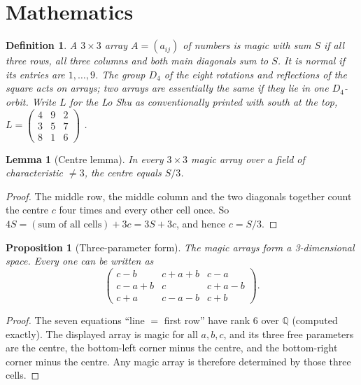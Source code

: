 \documentclass[pdflatex,sn-basic]{sn-jnl}
\theoremstyle{thmstyleone}
\newtheorem{lemma}[theorem]{Lemma}
\newtheorem{proposition}[theorem]{Proposition}
\theoremstyle{thmstylethree}
\newtheorem{definition}{Definition}
\newcommand{\sq}[9]{\begin{smallmatrix}#1&#2&#3\\#4&#5&#6\\#7&#8&#9\end{smallmatrix}}
\begin{document}
\section{Mathematics}
\label{sec:math}

\begin{definition}
A $3\times3$ array $A=(a_{ij})$ of numbers is \emph{magic} with sum $S$ if all three rows, all three columns and both main diagonals sum to $S$. It is \emph{normal} if its entries are $1,\dots,9$. The group $D_4$ of the eight rotations and reflections of the square acts on arrays; two arrays are \emph{essentially the same} if they lie in one $D_4$-orbit. Write $L$ for the Lo Shu as conventionally printed with south at the top, $L=\left(\sq{4}{9}{2}{3}{5}{7}{8}{1}{6}\right)$ \citep{cammann1961,wiki_luoshu}.
\end{definition}

\begin{lemma}[Centre lemma]\label{lem:centre}
In every $3\times3$ magic array over a field of characteristic $\neq3$, the centre equals $S/3$.
\end{lemma}
\begin{proof}
The middle row, the middle column and the two diagonals together count the centre $c$ four times and every other cell once. So $4S=(\text{sum of all cells})+3c=3S+3c$, and hence $c=S/3$.
\end{proof}

\begin{proposition}[Three-parameter form]\label{prop:lucas}
The magic arrays form a 3-dimensional space. Every one can be written as
\[\begin{pmatrix}c-b&c+a+b&c-a\\c-a+b&c&c+a-b\\c+a&c-a-b&c+b\end{pmatrix}.\]
\end{proposition}
\begin{proof}
The seven equations ``line $=$ first row'' have rank $6$ over $\mathbb{Q}$ (computed exactly). The displayed array is magic for all $a,b,c$, and its three free parameters are the centre, the bottom-left corner minus the centre, and the bottom-right corner minus the centre. Any magic array is therefore determined by those three cells.
\end{proof}
\end{document}

